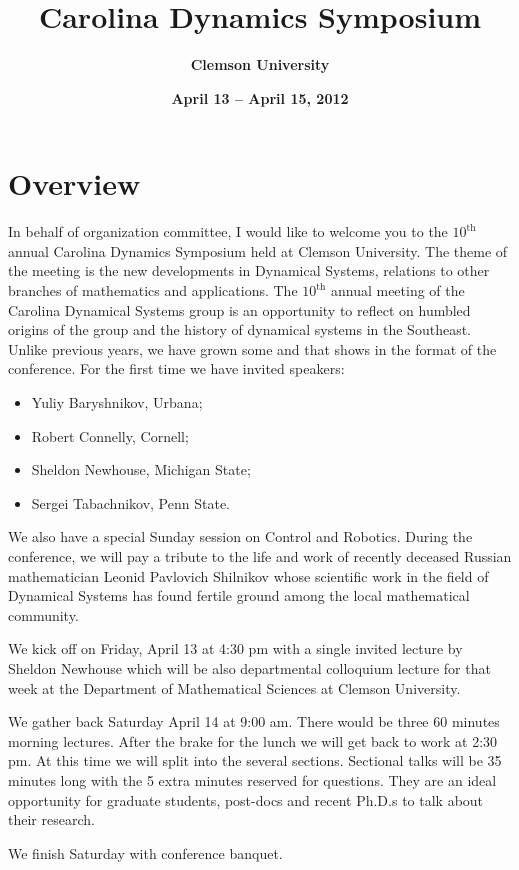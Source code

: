 \documentclass[10pt,foldmark,notumble]{leaflet}
\title{\bf Carolina Dynamics Symposium}
\author{%
\Large \bf Clemson University
}
\date{\bf April 13 -- April 15, 2012 }
\begin{document}
\maketitle
\section{Overview} In behalf of organization committee, I would like
to welcome you to the $10^{\mbox{th}}$ annual Carolina Dynamics
Symposium held at Clemson University. The theme of the meeting is the
new developments in Dynamical Systems, relations to other branches of
mathematics and applications. The $10^{\mbox{th}}$ annual meeting of the
Carolina Dynamical Systems group is an opportunity to reflect on humbled
origins of the group and the history of dynamical systems in the
Southeast. Unlike previous years, we have grown some and that shows in
the format of the conference. For the first time we have invited
speakers:

\begin{itemize}
\item Yuliy Baryshnikov, Urbana;
\item Robert Connelly, Cornell;
\item Sheldon Newhouse, Michigan State;
\item Sergei Tabachnikov, Penn State.
\end{itemize}

We also have a special Sunday session on Control and Robotics. During
the conference, we will pay a tribute to the life and work of recently
deceased Russian mathematician Leonid Pavlovich Shilnikov whose
scientific work in the field of Dynamical Systems has found fertile
ground among the local mathematical community.


We kick off on Friday, April 13 at 4:30 pm with a single invited lecture
by Sheldon Newhouse which will be also departmental colloquium lecture
for that week at the Department of Mathematical Sciences at Clemson
University.


We gather back Saturday April 14 at 9:00 am. There would be three 60
minutes morning lectures. After the brake for the lunch we will get back
to work at 2:30 pm. At this time we will split into the several
sections. Sectional talks will be 35 minutes long with the 5 extra
minutes reserved for questions. They are an ideal opportunity for
graduate students, post-docs and recent Ph.D.s to talk about their
research.


We finish Saturday with conference banquet.
\end{document}
